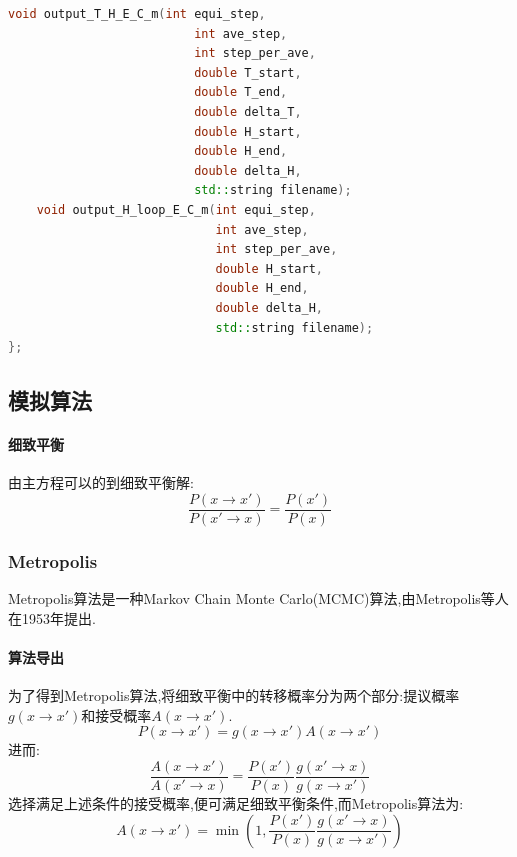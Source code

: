 \documentclass[12pt]{article} %
\begin{document}
\begin{lstlisting}[language=C++]
    void output_T_H_E_C_m(int equi_step,
                          int ave_step,
                          int step_per_ave,
                          double T_start,
                          double T_end,
                          double delta_T,
                          double H_start,
                          double H_end,
                          double delta_H,
                          std::string filename);
    void output_H_loop_E_C_m(int equi_step,
                             int ave_step,
                             int step_per_ave,
                             double H_start,
                             double H_end,
                             double delta_H,
                             std::string filename);
};
\end{lstlisting}

\subsection{模拟算法}
\paragraph{细致平衡}
由主方程\cite{Master_equ}可以的到细致平衡解:
\begin{equation}
\label{equ: Detaled_balance}
\frac{P(x\rightarrow x')}{P(x'\rightarrow x)} = \frac{P(x')}{P(x)}
\end{equation}

\subsubsection{Metropolis}
Metropolis算法\cite{Metropolis_wiki}是一种Markov Chain Monte Carlo(MCMC)算法,由Metropolis等人在1953年提出\cite{Metropolis:1953vj}.

\paragraph{算法导出}
为了得到Metropolis算法,将细致平衡中的转移概率分为两个部分:提议概率$g(x\rightarrow x')$和接受概率$A(x\rightarrow x')$.
$$P(x\rightarrow x') = g(x\rightarrow x')A(x\rightarrow x')$$
进而:
$$
\frac{A(x\rightarrow x')}{A(x'\rightarrow x)} = \frac{P(x')}{P(x)}\frac{g(x'\rightarrow x)}{g(x\rightarrow x')}
$$
选择满足上述条件的接受概率,便可满足细致平衡条件,而Metropolis算法为:
\begin{equation}
\label{equ: Metropolis}
A(x\rightarrow x') = \min\left(1,\frac{P(x')}{P(x)}\frac{g(x'\rightarrow x)}{g(x\rightarrow x')}\right)
\end{equation}
\end{document}
